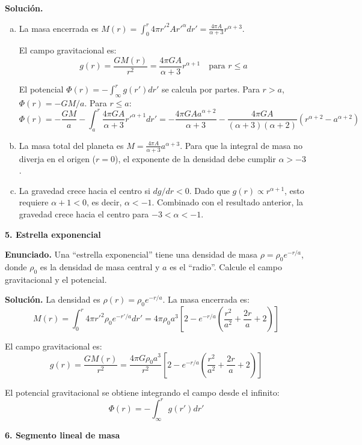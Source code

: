 \textbf{Solución.}
\begin{enumerate}[a)]
    \item La masa encerrada es $M(r) = \int_0^r 4\pi r'^2 A r'^\alpha dr' = \frac{4\pi A}{\alpha+3} r^{\alpha+3}$.
    
    El campo gravitacional es:
    $$ g(r) = \frac{GM(r)}{r^2} = \frac{4\pi G A}{\alpha+3} r^{\alpha+1} \quad \text{para } r \le a $$
    
    El potencial $\Phi(r) = -\int_{\infty}^r g(r') dr'$ se calcula por partes. Para $r > a$, $\Phi(r) = -GM/a$. Para $r \le a$:
    $$ \Phi(r) = -\frac{GM}{a} - \int_a^r \frac{4\pi G A}{\alpha+3} r'^{\alpha+1} dr' = -\frac{4\pi G A a^{\alpha+2}}{\alpha+3} - \frac{4\pi G A}{(\alpha+3)(\alpha+2)} \left(r^{\alpha+2} - a^{\alpha+2}\right) $$

    \item La masa total del planeta es $M = \frac{4\pi A}{\alpha+3} a^{\alpha+3}$. Para que la integral de masa no diverja en el origen ($r=0$), el exponente de la densidad debe cumplir $\alpha > -3$.

    \item La gravedad crece hacia el centro si $dg/dr < 0$. Dado que $g(r) \propto r^{\alpha+1}$, esto requiere $\alpha + 1 < 0$, es decir, $\alpha < -1$. Combinado con el resultado anterior, la gravedad crece hacia el centro para $-3 < \alpha < -1$.
\end{enumerate}

\medskip
{\large\bfseries 5. Estrella exponencial\par}
\smallskip

\textbf{Enunciado.} Una ``estrella exponencial'' tiene una densidad de masa $\rho = \rho_0 e^{-r/a}$, donde $\rho_0$ es la densidad de masa central y $a$ es el ``radio''. Calcule el campo gravitacional y el potencial.

\textbf{Solución.}
La densidad es $\rho(r) = \rho_0 e^{-r/a}$. La masa encerrada es:
$$ M(r) = \int_0^r 4\pi r'^2 \rho_0 e^{-r'/a} dr' = 4\pi \rho_0 a^3 \left[ 2 - e^{-r/a} \left( \frac{r^2}{a^2} + \frac{2r}{a} + 2 \right) \right] $$

El campo gravitacional es:
$$ g(r) = \frac{GM(r)}{r^2} = \frac{4\pi G \rho_0 a^3}{r^2} \left[ 2 - e^{-r/a} \left( \frac{r^2}{a^2} + \frac{2r}{a} + 2 \right) \right] $$

El potencial gravitacional se obtiene integrando el campo desde el infinito:
$$ \Phi(r) = -\int_{\infty}^r g(r') dr' $$

\medskip
{\large\bfseries 6. Segmento lineal de masa\par}
\smallskip

